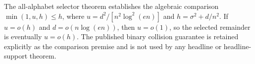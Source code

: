 The all-alphabet selector theorem establishes the algebraic comparison \(\min(1,u,h)\le h\), where \(u=d^2/[n^2\log^2(en)]\) and \(h=\sigma^2+d/n^2\). If \(u=o(h)\) and \(d=o(n\log(en))\), then \(u=o(1)\), so the selected remainder is eventually \(u=o(h)\). The published binary collision guarantee is retained explicitly as the comparison premise and is not used by any headline or headline-support theorem.